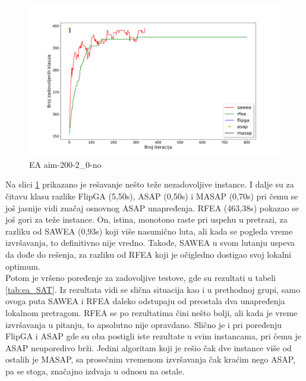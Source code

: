\documentclass[a4paper]{article}
\begin{document}
\begin{figure}[h!]
\centering
\includegraphics[width=\textwidth]{ea-aim-200-2_0-no}
\caption{EA aim-200-2\_0-no}\label{img:ea_no2}
\end{figure}

Na slici \ref{img:ea_no2} prikazano je rešavanje nešto teže nezadovoljive instance.
I dalje su za čitavu klasu razlike FlipGA (5,50s), ASAP (0,50s) i MASAP (0,70s)
pri čemu se još jasnije vidi značaj osnovnog ASAP unapređenja. RFEA (463,38s) 
pokazao se još gori za teže instance. 
On, istina, monotono raste pri uspehu u pretrazi, za razliku od SAWEA (0,93s) koji više 
nasumično luta, ali kada se pogleda vreme izvršavanja, to definitivno nije vredno.
Takođe, SAWEA u svom lutanju uspeva da dođe do rešenja, za razliku od RFEA
koji je očigledno dostigao svoj lokalni optimum.\\

Potom je vršeno poređenje za zadovoljive testove, gde su rezultati u tabeli \ref{tab:ea_SAT}.
Iz rezultata vidi se slična situacija kao i u prethodnoj grupi, samo ovoga puta 
SAWEA i RFEA daleko odstupaju od preostala dva unapređenja lokalnom pretragom.
RFEA se po rezultatima čini nešto bolji, ali kada je vreme izvršavanja u pitanju, to
apsolutno nije opravdano. Slično je i pri poređenju FlipGA i ASAP gde su oba postigli
iste rezultate u svim instancama, pri čemu je ASAP neuporedivo brži. 
Jedini algoritam koji je rešio čak dve instance više od ostalih je MASAP, 
sa prosečnim vremenom izvršavanja čak kraćim nego ASAP, pa se stoga, 
značajno izdvaja u odnosu na ostale. \\
\end{document}
